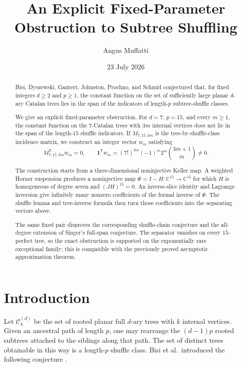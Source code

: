 \documentclass[11pt,reqno]{amsart}
\title[Fixed-parameter failure of subtree shuffling]
{An Explicit Fixed-Parameter Obstruction to Subtree Shuffling}
\author{Angus Muffatti}
\date{23 July 2026}
\newcommand{\C}{\mathbb C}
\newcommand{\cC}{\mathcal C}
\newcommand{\one}{\mathbf 1}
\begin{document}
\begin{abstract}
Bisi, Dyszewski, Gantert, Johnston, Prochno, and Schmid conjectured that,
for fixed integers $d\geq2$ and $p\geq1$, the constant function on the set
of sufficiently large planar $d$-ary Catalan trees lies in the span of the
indicators of length-$p$ subtree-shuffle classes.

We give an explicit fixed-parameter obstruction.  For $d=7$, $p=15$, and
every $m\geq1$, the constant function on the $7$-Catalan trees with $3m$
internal vertices does not lie in the span of the length-$15$ shuffle
indicators.  If $M_{7,15,3m}$ is the tree-by-shuffle-class incidence matrix,
we construct an integer vector $w_m$ satisfying
\[
 M_{7,15,3m}^{\mathsf T}w_m=0,
 \qquad
 \one^{\mathsf T}w_m
 =(7!)^{3m}(-1)^m2^m\binom{3m+1}{m}\neq0.
\]

The construction starts from a three-dimensional noninjective Keller map.
A weighted Horner suspension produces a noninjective map
$\Phi=I-H:\C^{15}\to\C^{15}$ for which $H$ is homogeneous of degree seven
and $(JH)^{15}=0$.  An inverse-slice identity and Lagrange inversion give
infinitely many nonzero coefficients of the formal inverse of $\Phi$.
The shuffle lemma and tree-inverse formula then turn those coefficients
into the separating vectors above.

The same fixed pair disproves the corresponding shuffle-chain conjecture
and the all-degree extension of Singer's full-span conjecture.  The
separator vanishes on every $15$-perfect tree, so the exact obstruction is
supported on the exponentially rare exceptional family; this is compatible
with the previously proved asymptotic approximation theorem.
\end{abstract}

\maketitle

\section{Introduction}

Let $\cC_k^{(d)}$ be the set of rooted planar full $d$-ary trees with $k$
internal vertices.  Given an ancestral path of length $p$, one may rearrange
the $(d-1)p$ rooted subtrees attached to the siblings along that path.  The
set of distinct trees obtainable in this way is a length-$p$ shuffle class.
Bisi et al.\ introduced the following conjecture \cite[Conjecture~1.3]{BisiEtAl}.
\end{document}
